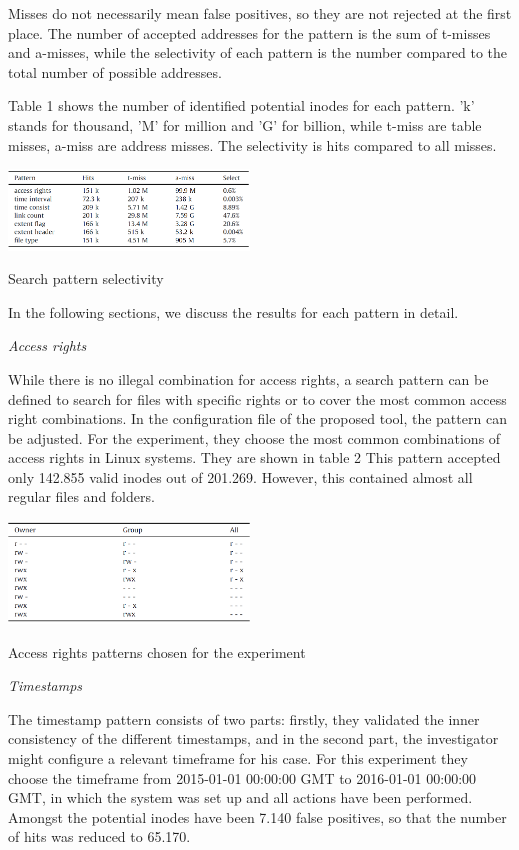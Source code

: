 \documentclass{acm_proc_article-sp}
\begin{document}
Misses do not necessarily mean false positives, so they are not rejected at the first place. The number of accepted addresses for the pattern is the sum of t-misses and a-misses, while the selectivity of each pattern is the number compared to the total number of possible addresses.

Table 1 shows the number of identified potential inodes for each pattern. 'k' stands for thousand, 'M' for million and 'G' for billion, while t-miss are table misses, a-miss are address misses. The selectivity is hits compared to all misses.

\begin{table}
\centering
\includegraphics[width=0.48\textwidth]{images/selectivity.png}
	\caption{Search pattern selectivity}
\end{table}


In the following sections, we discuss the results for each pattern in detail.

\textit{Access rights}

While there is no illegal combination for access rights, a search pattern can be defined to search for files with specific rights or to cover the most common access right combinations. In the configuration file of the proposed tool, the pattern can be adjusted. For the experiment, they choose the most common combinations of access rights in Linux systems. They are shown in table 2
This pattern accepted only 142.855 valid inodes out of 201.269.  However, this contained almost all regular files and folders.

\begin{table}
\centering
\includegraphics[width=0.48\textwidth]{images/rights.png}
	\caption{Access rights patterns chosen for the experiment}
\end{table}

\textit{Timestamps}

The timestamp pattern consists of two parts: firstly, they validated the inner consistency of the different timestamps, and in the second part, the investigator might configure a relevant timeframe for his case. For this experiment they choose the timeframe from 2015-01-01 00:00:00 GMT to 2016-01-01 00:00:00 GMT, in which the system was set up and all actions have been performed. Amongst the potential inodes have been 7.140 false positives, so that the number of hits was reduced to 65.170.
\end{document}
